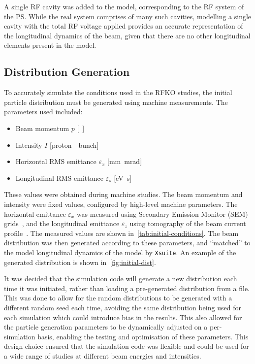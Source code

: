 \documentclass[a4paper,twoside,11pt]{report}
\begin{document}
A single RF cavity was added to the model, corresponding to the RF system of the PS. While the real system comprises of many such cavities, modelling a single cavity with the total RF voltage applied provides an accurate representation of the longitudinal dynamics of the beam, given that there are no other longitudinal elements present in the model.

\subsection{Distribution Generation}

To accurately simulate the conditions used in the RFKO studies, the initial particle distribution must be generated using machine measurements. The parameters used included:
\begin{itemize}
  \item Beam momentum $p$ [\si{\giga\eVperc}]
  \item Intensity $I$ [\si{proton \per bunch}]
  \item Horizontal RMS emittance $\varepsilon_x$ [\si{\milli\meter\milli\radian}]
  \item Longitudinal RMS emittance $\varepsilon_s$ [\si{\electronvolt\second}]
\end{itemize}  

These values were obtained during machine studies. The beam momentum and intensity were fixed values, configured by high-level machine parameters. The horizontal emittance $\varepsilon_x$ was measured using Secondary Emission Monitor (SEM) grids~\cite{Martini:324553}, and the longitudinal emittance $\varepsilon_z$ using tomography of the beam current profile~\cite{Hancock:960231}. The measured values are shown in~\autoref{tab:initial-conditions}. The beam distribution was then generated according to these parameters, and ``matched'' to the model longitudinal dynamics of the model by \verb|Xsuite|. An example of the generated distribution is shown in~\autoref{fig:initial-dist}.

It was decided that the simulation code will generate a new distribution each time it was initiated, rather than loading a pre-generated distribution from a file. This was done to allow for the random distributions to be generated with a different random seed each time, avoiding the same distribution being used for each simulation which could introduce bias in the results. This also allowed for the particle generation parameters to be dynamically adjusted on a per-simulation basis, enabling the testing and optimisation of these parameters. This design choice ensured that the simulation code was flexible and could be used for a wide range of studies at different beam energies and intensities.
\end{document}
